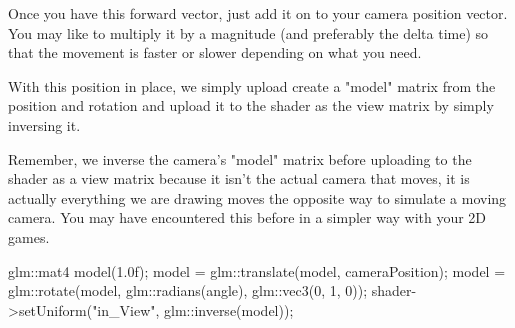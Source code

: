\documentclass[10pt]{article}
\begin{document}
Once you have this forward vector, just add it on to your camera position
vector. You may like to multiply it by a magnitude (and preferably the
delta time) so that the movement is faster or slower depending on what
you need.

With this position in place, we simply upload create a "model" matrix
from the position and rotation and upload it to the shader as the view
matrix by simply inversing it.

\Note
{
Remember, we inverse the camera's "model" matrix before uploading to the
shader as a view matrix because it isn't the actual camera that moves, it
is actually everything we are drawing moves the opposite way to simulate a
moving camera. You may have encountered this before in a simpler way with your 2D games.
}

\begin{Code}

glm::mat4 model(1.0f);
model = glm::translate(model, cameraPosition);
model = glm::rotate(model, glm::radians(angle), glm::vec3(0, 1, 0));
shader->setUniform("in_View", glm::inverse(model));

\end{Code}


\end{document}
